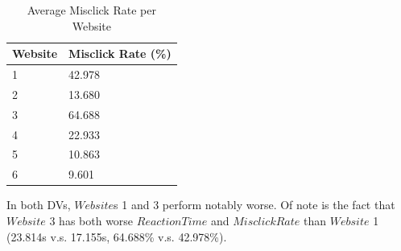 \documentclass[12pt,twoside]{reedthesis}
\begin{document}
    \begin{table}[h!]
            \centering
            \begin{tabular}{| p{3.5cm} | p{3.5cm} |}
                \hline
                Website & Misclick Rate (\%)\\
                \hline
                1 & 42.978\\
                \hline
                2 & 13.680\\
                \hline
                3 & 64.688\\
                \hline
                4 & 22.933\\
                \hline
                5 & 10.863\\
                \hline
                6 & 9.601\\
                \hline
            \end{tabular}
            \caption{Average Misclick Rate per Website}
            \label{avg_mr}
        \end{table}
    
    In both DVs, $Website$s 1 and 3 perform notably worse. Of note is the fact that $Website$ 3 has both worse $ReactionTime$ and $MisclickRate$ than $Website$ 1 (23.814s v.s. 17.155s, 64.688\% v.s. 42.978\%). 
\end{document}
